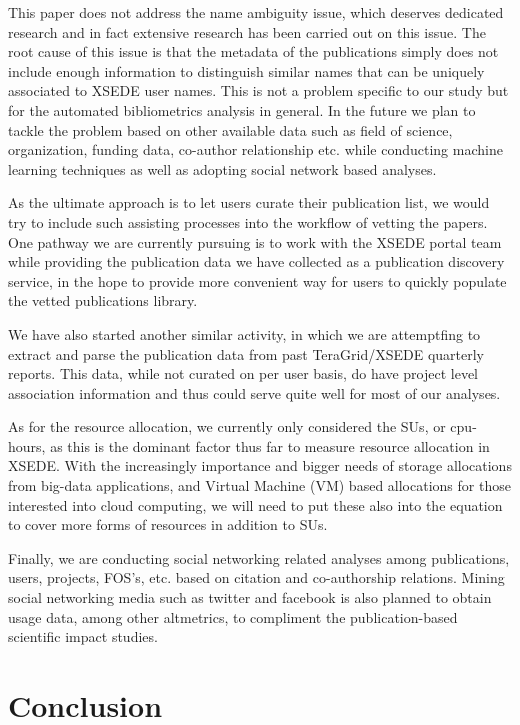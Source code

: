 \documentclass{sig-alternate}
\begin{document}
This paper does not address the name ambiguity issue, which deserves dedicated research and in fact extensive research has been carried out on this issue. The root cause of this issue is that the metadata of the publications simply does not include enough information to distinguish similar names that can be uniquely associated to XSEDE user names. This is not a problem specific to our study but for the automated bibliometrics analysis in general. In the future we plan to tackle the problem based on other available data such as field of science, organization, funding data, co-author relationship etc. while conducting machine learning techniques as well as adopting social network based analyses.

As the ultimate approach is to let users curate their publication list, we would try to include such assisting processes into the workflow of vetting the papers. One pathway we are currently pursuing is to work with the XSEDE portal team while providing the publication data we have collected as a publication discovery service, in the hope to provide more convenient way for users to quickly populate the vetted publications library. 

We have also started another similar activity, in which we are attemptfing to extract and parse the publication data from past TeraGrid/XSEDE quarterly reports. This data, while not curated on per user basis, do have project level association information and thus could serve quite well for most of our analyses.

As for the resource allocation, we currently only considered the SUs, or cpu-hours, as this is the dominant factor thus far to measure resource allocation in XSEDE. With the increasingly importance and bigger needs of storage allocations from big-data applications, and Virtual Machine (VM) based allocations for those interested into cloud computing, we will need to put these also into the equation to cover more forms of resources in addition to SUs.

Finally, we are conducting social networking related analyses among publications, users, projects, FOS's, etc. based on citation and co-authorship relations. Mining social networking media such as twitter and facebook is also planned to obtain usage data, among other altmetrics, to compliment the publication-based scientific impact studies.

\section{Conclusion} \label{S:conclusion}
\end{document}
